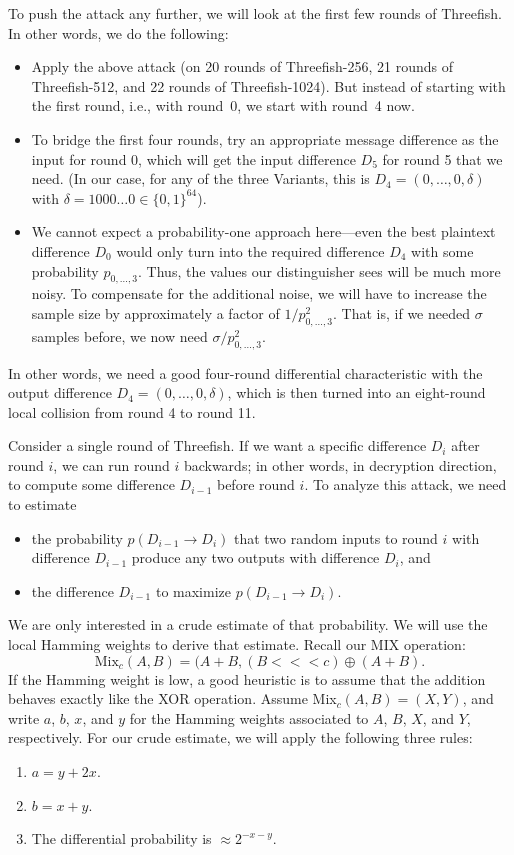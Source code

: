 \documentclass[11pt,twoside]{article}
\begin{document}
To push the attack any further, we will look at the first few rounds of Threefish. In other words, we do the following:
\begin{itemize}
  \item Apply the above attack (on 20 rounds of Threefish-256, 21 rounds of 
    Threefish-512, and 22 rounds of Threefish-1024). But instead of
    starting with the first round, i.e., with round~0, we start with 
    round~4 now.
  \item To bridge the first four rounds, try an appropriate message
    difference as the input for round 0, which will get the input difference
    $D_5$ for round 5 that we need. (In our case, for any of the three
    Variants, this is $D_4 = (0, \ldots, 0, \delta)$ with $\delta=1000\ldots0
    \in \{0,1\}^{64}$).
  \item We cannot expect a probability-one approach here---even the best
    plaintext difference $D_0$ would only turn into the required difference
    $D_4$ with some probability $p_{0,\ldots,3}$. Thus, the values our
    distinguisher sees will be much more noisy. To compensate for the
    additional noise, we will have to increase the sample size by
    approximately a factor of $1/p^2_{0,\ldots,3}$. That is, if we needed
    $\sigma$ samples before, we now need $\sigma/p^2_{0,\ldots,3}$.
\end{itemize}
In other words, we need a good four-round differential characteristic with the output difference $D_4 = (0, \ldots, 0, \delta)$, which is then turned into an eight-round local collision from round 4 to round 11.

Consider a single round of Threefish.  If we want a specific difference $D_i$ after round $i$, we can run round $i$ backwards; in other words, in decryption direction, to compute some difference $D_{i-1}$ before round $i$. To analyze this attack, we need to estimate
\begin{itemize}
  \item the probability $p(D_{i-1} \rightarrow D_i)$ that two random
    inputs to round $i$ with difference $D_{i-1}$ produce any two outputs 
    with difference $D_i$, and
  \item the difference $D_{i-1}$ to maximize $p(D_{i-1} \rightarrow D_i)$.
\end{itemize}
We are only interested in a crude estimate of that probability. We will use the local Hamming weights to derive that estimate. Recall our MIX operation:
  \[ \mbox{Mix}_c(A,B) = (A+B, (B<\!<\!<c) \oplus (A+B). \]
If the Hamming weight is low, a good heuristic is to assume that the addition behaves exactly like the XOR operation. Assume Mix$_c(A,B)=(X,Y)$, and write $a$, $b$, $x$, and $y$ for the Hamming weights associated to $A$, $B$, $X$, and $Y$, respectively. For our crude estimate, we will apply the following three rules:
\begin{enumerate}
  \item $a = y+2x$.
  \item $b = x+y$.
  \item The differential probability is $\approx 2^{-x-y}$.
\end{enumerate}
\end{document}
